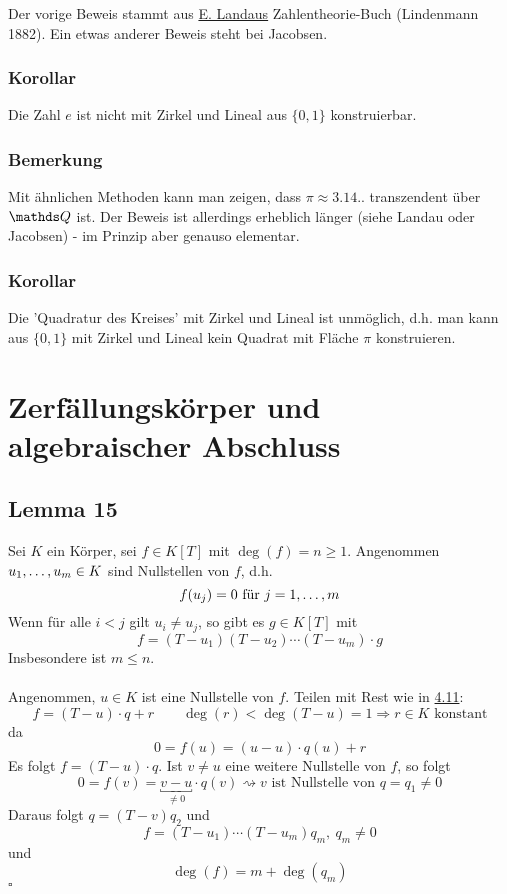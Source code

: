 Der vorige Beweis stammt aus \uline{E. Landaus} Zahlentheorie-Buch (Lindenmann 1882).
Ein etwas anderer Beweis steht bei Jacobsen.

\subsubsection*{Korollar}
Die Zahl $e$ ist nicht mit Zirkel und Lineal aus $\{0,1\}$  konstruierbar.

\subsubsection*{Bemerkung}
Mit ähnlichen Methoden kann man zeigen, dass $\pi\approx 3.14..$ transzendent über $\Q$ ist.
Der Beweis ist allerdings erheblich länger (siehe Landau oder Jacobsen) - im Prinzip aber genauso elementar.

\subsubsection*{Korollar}
Die 'Quadratur des Kreises' mit Zirkel und Lineal ist unmöglich, d.h. man kann aus $\{0,1\}$ mit Zirkel und Lineal kein Quadrat mit Fläche $\pi$ konstruieren.


\newpage
\section{Zerfällungskörper und algebraischer Abschluss}
\label{sec:zerfaellungskoerper_alg_abschluss}
\subsection{Lemma 15}
\label{sub:lemma_15}
Sei $K$ ein Körper, sei $f\in K[T]$ mit $\deg(f)=n\ge1$.
Angenommen $u_1, \dots ,u_m\in K$ sind Nullstellen von $f$, d.h.
\[
f(u_j)=0 \text{ für } j=1, \dots ,m
\]
Wenn für alle $i<j$ gilt $u_i\neq u_j$, so gibt es $g\in K[T]$ mit 
\[
f=(T-u_1)(T-u_2)\cdots(T-u_m)\cdot g
\]
Insbesondere ist $m\le n$.\\

\\
Angenommen, $u\in K$ ist eine Nullstelle von $f$.
Teilen mit Rest wie in \hyperref[sub:polynomdivision]{4.11}:
\[
f=(T-u)\cdot q+r\qquad \deg(r)<\deg(T-u)=1\Rightarrow r\in K\text{ konstant}
\]
da
\[
0=f(u)=(u-u)\cdot q(u)+r
\]
Es folgt $f=(T-u)\cdot q$.
Ist $v\neq u$ eine weitere Nullstelle von $f$, so folgt
\[
0=f(v)=\underbracket{v-u}_{\neq 0}\cdot q(v)\rightsquigarrow v\text{ ist Nullstelle von }q=q_1\neq 0
\]
Daraus folgt $q=(T-v)q_2$ und
\[
f=(T-u_1)\cdots(T-u_m)q_m,~q_m\neq 0
\]
und
\[
\deg(f)=m+\deg(q_m)
\]
\hfill $\square$

